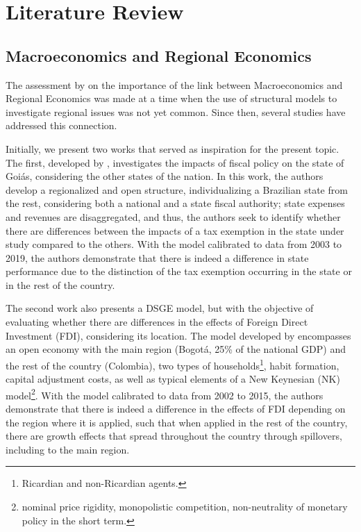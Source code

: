 \documentclass[
	thesis.tex
	]{subfiles}
\begin{document}
	\section{Literature Review}
	
	\subsection*{Macroeconomics and Regional Economics}
	
	The assessment by \textcite{rickman_modern_2010} on the importance of the link between Macroeconomics and Regional Economics was made at a time when the use of structural models to investigate regional issues was not yet common. Since then, several studies have addressed this connection.
	
	Initially, we present two works that served as inspiration for the present topic. The first, developed by \textcite{costa_junior_dsge_2022}, investigates the impacts of fiscal policy on the state of Goiás, considering the other states of the nation. In this work, the authors develop a regionalized and open structure, individualizing a Brazilian state from the rest, considering both a national and a state fiscal authority; state expenses and revenues are disaggregated, and thus, the authors seek to identify whether there are differences between the impacts of a tax exemption in the state under study compared to the others. With the model calibrated to data from 2003 to 2019, the authors demonstrate that there is indeed a difference in state performance due to the distinction of the tax exemption occurring in the state or in the rest of the country.
	
	The second work also presents a DSGE model, but with the objective of evaluating whether there are differences in the effects of Foreign Direct Investment (FDI), considering its location. The model developed by \textcite{mora_fdi_2019} encompasses an open economy with the main region (Bogotá, 25\% of the national GDP) and the rest of the country (Colombia), two types of households\footnote{ Ricardian and non-Ricardian agents.}, habit formation, capital adjustment costs, as well as typical elements of a New Keynesian (NK) model\footnote{ nominal price rigidity, monopolistic competition, non-neutrality of monetary policy in the short term.}. With the model calibrated to data from 2002 to 2015, the authors demonstrate that there is indeed a difference in the effects of FDI depending on the region where it is applied, such that when applied in the rest of the country, there are growth effects that spread throughout the country through spillovers, including to the main region.
	
\end{document}
